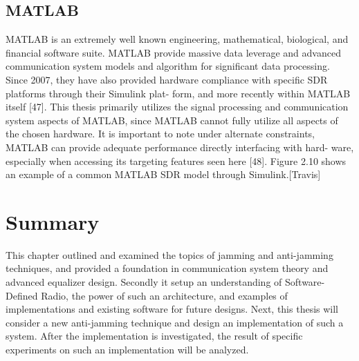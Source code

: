 \subsection{MATLAB}
MATLAB is an extremely well known engineering, mathematical, biological, and financial software suite. MATLAB provide massive data leverage and advanced communication
system models and algorithm for significant data processing. Since 2007, they have also provided hardware compliance with specific SDR platforms through their Simulink plat-
form, and more recently within MATLAB itself [47]. This thesis primarily utilizes the signal processing and communication system aspects of MATLAB, since MATLAB cannot
fully utilize all aspects of the chosen hardware. It is important to note under alternate constraints, MATLAB can provide adequate performance directly interfacing with hard-
ware, especially when accessing its targeting features seen here [48]. Figure 2.10 shows an example of a common MATLAB SDR model through Simulink.[Travis]


\section{Summary}
This chapter outlined and examined the topics of jamming and anti-jamming techniques, and provided a foundation in communication system theory and advanced equalizer design.  Secondly it setup an understanding of Software-Defined Radio, the power of such an architecture, and examples of implementations and existing software for future designs.  Next, this thesis will consider a new anti-jamming technique and design an implementation of such a system.  After the implementation is investigated, the result of specific experiments on such an implementation will be analyzed.\\
